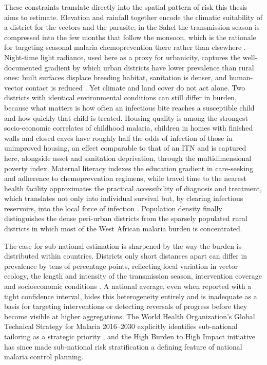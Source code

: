 \documentclass{article}
\begin{document}
These constraints translate directly into the spatial pattern of risk
this thesis aims to estimate. Elevation and rainfall together encode the
climatic suitability of a district for the vectors and the parasite; in
the Sahel the transmission season is compressed into the few months that
follow the monsoon, which is the rationale for targeting seasonal
malaria chemoprevention there rather than elsewhere
\citep{cairns2012estimating, who2012smc}. Night-time light radiance,
used here as a proxy for urbanicity, captures the well-documented
gradient by which urban districts have lower prevalence than rural ones:
built surfaces displace breeding habitat, sanitation is denser, and
human-vector contact is reduced \citep{hay2005urbanization}. Yet climate
and land cover do not act alone. Two districts with identical
environmental conditions can still differ in burden, because what
matters is how often an infectious bite reaches a susceptible child and
how quickly that child is treated. Housing quality is among the
strongest socio-economic correlates of childhood malaria, children in
homes with finished walls and closed eaves have roughly half the odds of
infection of those in unimproved housing, an effect comparable to that
of an ITN \citep{tusting2017housing, tusting2019mapping} and is captured
here, alongside asset and sanitation deprivation, through the
multidimensional poverty index. Maternal literacy indexes the education
gradient in care-seeking and adherence to chemoprevention regimens,
while travel time to the nearest health facility approximates the
practical accessibility of diagnosis and treatment, which translates not
only into individual survival but, by clearing infectious reservoirs,
into the local force of infection \citep{weiss2020}. Population density
finally distinguishes the dense peri-urban districts from the sparsely
populated rural districts in which most of the West African malaria
burden is concentrated.

The case for sub-national estimation is sharpened by the way the burden
is distributed within countries. Districts only short distances apart
can differ in prevalence by tens of percentage points, reflecting local
variation in vector ecology, the length and intensity of the
transmission season, intervention coverage and socioeconomic conditions
\citep{bhatt2015, weiss2020}. A national average, even when reported
with a tight confidence interval, hides this heterogeneity entirely and
is inadequate as a basis for targeting interventions or detecting
reversals of progress before they become visible at higher aggregations.
The World Health Organization's Global Technical Strategy for Malaria
2016--2030 explicitly identifies sub-national tailoring as a strategic
priority \citep{who2023}, and the High Burden to High Impact initiative
has since made sub-national risk stratification a defining feature of
national malaria control planning.
\end{document}
